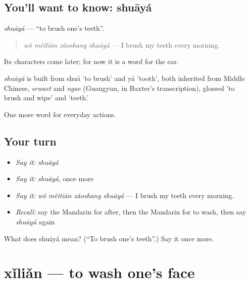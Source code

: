 \subsection*{You'll want to know: shuāyá}
\emph{shuāyá} — \textquotedblleft{}to brush one's teeth\textquotedblright{}.

\begin{quote}
\emph{wǒ měitiān zǎoshang shuāyá} — I brush my teeth every morning.
\end{quote}

Its characters come later; for now it is a word for the ear.

\begin{cousinweb}
\emph{shuāyá} is built from shuā 'to brush' and yá 'tooth', both inherited from Middle Chinese, \emph{srwaet} and \emph{ngae} (Guangyun, in Baxter's transcription), glossed 'to brush and wipe' and 'teeth'.
\end{cousinweb}

\begin{grammarlens}[title={What you've built}]
One more word for everyday actions.
\end{grammarlens}

\subsection*{Your turn}
\begin{itemize}
\raggedright
  \item \emph{Say it:} \emph{shuāyá}
  \item \emph{Say it:} \emph{shuāyá}, once more
  \item \emph{Say it:} \emph{wǒ měitiān zǎoshang shuāyá} — I brush my teeth every morning.
  \item \emph{Recall:} say the Mandarin for after, then the Mandarin for to wash, then say \emph{shuāyá} again
\end{itemize}

\begin{tcolorbox}[breakable,colback=teal!4,colframe=teal!35!black,title={Before you move on}]
What does shuāyá mean? (\textquotedblleft{}To brush one's teeth\textquotedblright{}.) Say it once more.
\end{tcolorbox}
\section[xǐliǎn]{xǐliǎn — to wash one's face}

\label{lesson:ZH-C99-xilian}



